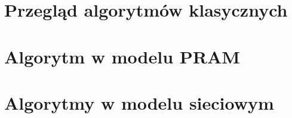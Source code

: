 \section{Przegląd algorytmów klasycznych}


\section{Algorytm w modelu PRAM}


\section{Algorytmy w modelu sieciowym}



